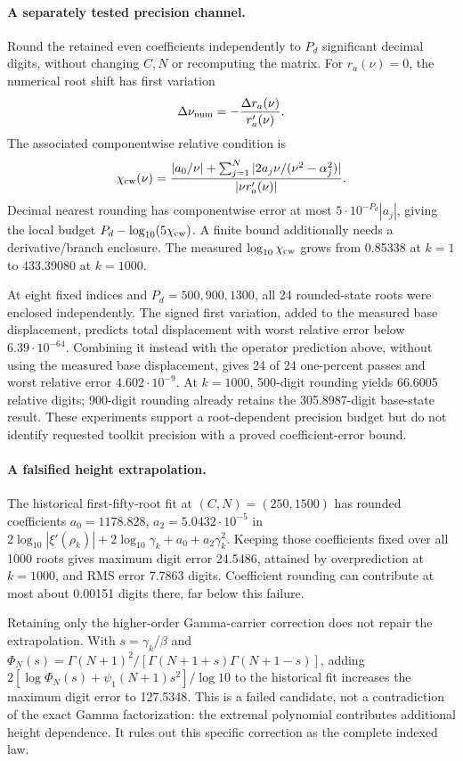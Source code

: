 \paragraph{A separately tested precision channel.}
Round the retained even coefficients independently to $P_d$ significant
decimal digits, without changing $C,N$ or recomputing the matrix. For
$r_a(\nu)=0$, the numerical root shift has first variation
\[
 \Delta\nu_{\rm num}=-\frac{\Delta r_a(\nu)}{r_a'(\nu)}.
\]
The associated componentwise relative condition is
\begin{equation}\label{eq:componentwise-indexed-condition}
 \chi_{\rm cw}(\nu)=
 \frac{|a_0/\nu|+\sum_{j=1}^N|2a_j\nu/(\nu^2-\alpha_j^2)|}
      {|\nu r_a'(\nu)|}.
\end{equation}
Decimal nearest rounding has componentwise error at most
$5\cdot10^{-P_d}|a_j|$, giving the local budget
$P_d-\log_{10}(5\chi_{\rm cw})$. A finite bound additionally needs a
derivative/branch enclosure. The measured $\log_{10}\chi_{\rm cw}$ grows
from 0.85338 at $k=1$ to 433.39080 at $k=1000$.

At eight fixed indices and $P_d=500,900,1300$, all 24 rounded-state roots
were enclosed independently. The signed first variation, added to the
measured base displacement, predicts total displacement with worst relative
error below $6.39\cdot10^{-64}$. Combining it instead with the operator
prediction above, without using the measured base displacement, gives
24 of 24 one-percent passes and worst relative error
$4.602\cdot10^{-9}$. At $k=1000$, 500-digit rounding yields 66.6005
relative digits; 900-digit rounding already retains the 305.8987-digit
base-state result. These experiments support a root-dependent precision
budget but do not identify requested toolkit precision with a proved
coefficient-error bound.

\paragraph{A falsified height extrapolation.}
The historical first-fifty-root fit at $(C,N)=(250,1500)$ has rounded
coefficients $a_0=1178.828$, $a_2=5.0432\cdot10^{-5}$ in
$2\log_{10}|\xi'(\rho_k)|+2\log_{10}\gamma_k+a_0+a_2\gamma_k^2$.
Keeping those coefficients fixed over all 1000 roots gives maximum
digit error 24.5486, attained by overprediction at $k=1000$, and RMS
error 7.7863 digits. Coefficient rounding can contribute at most about
0.00151 digits there, far below this failure.

Retaining only the higher-order Gamma-carrier correction does not repair
the extrapolation. With $s=\gamma_k/\beta$ and
$\Phi_N(s)=\Gamma(N+1)^2/[\Gamma(N+1+s)\Gamma(N+1-s)]$, adding
$2[\log\Phi_N(s)+\psi_1(N+1)s^2]/\log10$ to the historical fit
increases the maximum digit error to 127.5348. This is a failed candidate,
not a contradiction of the exact Gamma factorization: the extremal
polynomial contributes additional height dependence. It rules out this
specific correction as the complete indexed law.

